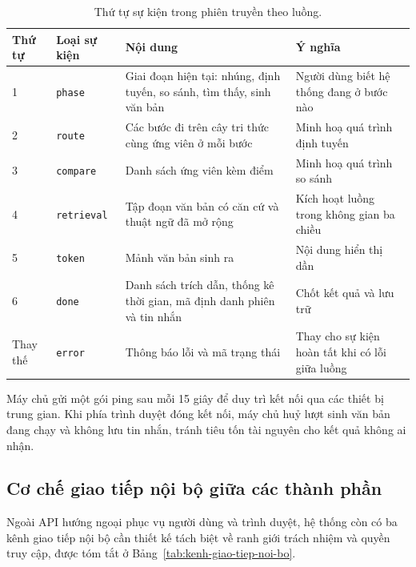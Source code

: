 \begin{table}[htbp]
    \centering
    \caption{Thứ tự sự kiện trong phiên truyền theo luồng.}
    \label{tab:su-kien-sse}
    \small
    \begin{tabularx}{\textwidth}{@{}l>{\raggedright\arraybackslash}p{2.2cm}>{\raggedright\arraybackslash}X>{\raggedright\arraybackslash}p{4.3cm}@{}}
        \toprule
        \textbf{Thứ tự} & \textbf{Loại sự kiện} & \textbf{Nội dung} & \textbf{Ý nghĩa} \\
        \midrule
        1 & \texttt{phase} & Giai đoạn hiện tại: nhúng, định tuyến, so sánh, tìm thấy, sinh văn bản & Người dùng biết hệ thống đang ở bước nào \\
        2 & \texttt{route} & Các bước đi trên cây tri thức cùng ứng viên ở mỗi bước & Minh hoạ quá trình định tuyến \\
        3 & \texttt{compare} & Danh sách ứng viên kèm điểm & Minh hoạ quá trình so sánh \\
        4 & \texttt{retrieval} & Tập đoạn văn bản có căn cứ và thuật ngữ đã mở rộng & Kích hoạt luồng trong không gian ba chiều \\
        5 & \texttt{token} & Mảnh văn bản sinh ra & Nội dung hiển thị dần \\
        6 & \texttt{done} & Danh sách trích dẫn, thống kê thời gian, mã định danh phiên và tin nhắn & Chốt kết quả và lưu trữ \\
        Thay thế & \texttt{error} & Thông báo lỗi và mã trạng thái & Thay cho sự kiện hoàn tất khi có lỗi giữa luồng \\
        \bottomrule
    \end{tabularx}
\end{table}

Máy chủ gửi một gói ping sau mỗi 15 giây để duy trì kết nối qua các thiết bị trung gian. Khi phía trình duyệt đóng kết nối, máy chủ huỷ lượt sinh văn bản đang chạy và không lưu tin nhắn, tránh tiêu tốn tài nguyên cho kết quả không ai nhận.

\subsection{Cơ chế giao tiếp nội bộ giữa các thành phần}
\label{subsec:giao-tiep-noi-bo}

Ngoài API hướng ngoại phục vụ người dùng và trình duyệt, hệ thống còn có ba kênh giao tiếp nội bộ cần thiết kế tách biệt về ranh giới trách nhiệm và quyền truy cập, được tóm tắt ở Bảng~\ref{tab:kenh-giao-tiep-noi-bo}.

